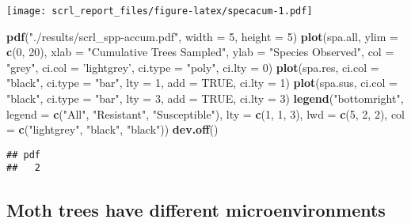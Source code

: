 \documentclass[]{article}
\newenvironment{Shaded}{\begin{snugshade}}{\end{snugshade}}
\newcommand{\KeywordTok}[1]{\textcolor[rgb]{0.13,0.29,0.53}{\textbf{#1}}}
\newcommand{\DataTypeTok}[1]{\textcolor[rgb]{0.13,0.29,0.53}{#1}}
\newcommand{\DecValTok}[1]{\textcolor[rgb]{0.00,0.00,0.81}{#1}}
\newcommand{\StringTok}[1]{\textcolor[rgb]{0.31,0.60,0.02}{#1}}
\newcommand{\OtherTok}[1]{\textcolor[rgb]{0.56,0.35,0.01}{#1}}
\newcommand{\NormalTok}[1]{#1}
\begin{document}
\texttt{[image: scrl\_report\_files/figure-latex/specacum-1.pdf]}

\begin{Shaded}
\begin{Highlighting}[]
\KeywordTok{pdf}\NormalTok{(}\StringTok{"./results/scrl_spp-accum.pdf"}\NormalTok{, }\DataTypeTok{width =} \DecValTok{5}\NormalTok{, }\DataTypeTok{height =} \DecValTok{5}\NormalTok{)}
\KeywordTok{plot}\NormalTok{(spa.all,}
     \DataTypeTok{ylim =} \KeywordTok{c}\NormalTok{(}\DecValTok{0}\NormalTok{, }\DecValTok{20}\NormalTok{),}
     \DataTypeTok{xlab =} \StringTok{"Cumulative Trees Sampled"}\NormalTok{,}
     \DataTypeTok{ylab =} \StringTok{"Species Observed"}\NormalTok{, }
     \DataTypeTok{col =} \StringTok{"grey"}\NormalTok{, }\DataTypeTok{ci.col =} \StringTok{'lightgrey'}\NormalTok{, }\DataTypeTok{ci.type =} \StringTok{"poly"}\NormalTok{, }\DataTypeTok{ci.lty =} \DecValTok{0}\NormalTok{)}
\KeywordTok{plot}\NormalTok{(spa.res, }\DataTypeTok{ci.col =} \StringTok{"black"}\NormalTok{, }\DataTypeTok{ci.type =} \StringTok{"bar"}\NormalTok{, }\DataTypeTok{lty =} \DecValTok{1}\NormalTok{, }\DataTypeTok{add =} \OtherTok{TRUE}\NormalTok{, }\DataTypeTok{ci.lty =} \DecValTok{1}\NormalTok{)}
\KeywordTok{plot}\NormalTok{(spa.sus, }\DataTypeTok{ci.col =} \StringTok{"black"}\NormalTok{, }\DataTypeTok{ci.type =} \StringTok{"bar"}\NormalTok{, }\DataTypeTok{lty =} \DecValTok{3}\NormalTok{, }\DataTypeTok{add =} \OtherTok{TRUE}\NormalTok{, }\DataTypeTok{ci.lty =} \DecValTok{3}\NormalTok{)}
\KeywordTok{legend}\NormalTok{(}\StringTok{"bottomright"}\NormalTok{, }
       \DataTypeTok{legend =} \KeywordTok{c}\NormalTok{(}\StringTok{"All"}\NormalTok{, }\StringTok{"Resistant"}\NormalTok{, }\StringTok{"Susceptible"}\NormalTok{), }
       \DataTypeTok{lty =} \KeywordTok{c}\NormalTok{(}\DecValTok{1}\NormalTok{, }\DecValTok{1}\NormalTok{, }\DecValTok{3}\NormalTok{), }\DataTypeTok{lwd =} \KeywordTok{c}\NormalTok{(}\DecValTok{5}\NormalTok{, }\DecValTok{2}\NormalTok{, }\DecValTok{2}\NormalTok{), }\DataTypeTok{col =} \KeywordTok{c}\NormalTok{(}\StringTok{"lightgrey"}\NormalTok{, }\StringTok{"black"}\NormalTok{, }\StringTok{"black"}\NormalTok{))}
\KeywordTok{dev.off}\NormalTok{()}
\end{Highlighting}
\end{Shaded}

\begin{verbatim}
## pdf 
##   2
\end{verbatim}

\subsection{Moth trees have different
microenvironments}\label{moth-trees-have-different-microenvironments}
\end{document}
